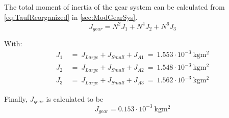 The total moment of inertia of the gear system can be calculated from \autoref{eq:TaufReorganized} in \autoref{sec:ModGearSys}.
\begin{equation}
	J_{gear} = N^2J_1 + N^4J_2 + N^6J_3
\end{equation}

With:
\begin{subequations} \label{eq:J1J2J3}
	\begin{flalign}
		J_{1} \:&=\: J_{Large} + J_{Small} + J_{A1} \:=\: 1.553 \cdot 10^{-3}\ \si{\kilo\gram\meter\squared} \\
		J_{2} \:&=\: J_{Large} + J_{Small} + J_{A2} \:=\: 1.548 \cdot 10^{-3}\ \si{\kilo\gram\meter\squared} \\
		J_{3} \:&=\: J_{Large} + J_{Small} + J_{A3} \:=\: 1.562 \cdot 10^{-3}\ \si{\kilo\gram\meter\squared} 
	\end{flalign}
\end{subequations}

Finally, $J_{gear}$ is calculated to be
\begin{equation}
	J_{gear} = 0.153 \cdot 10^{-3}\ \si{\kilo\gram\meter\squared}
\end{equation}






